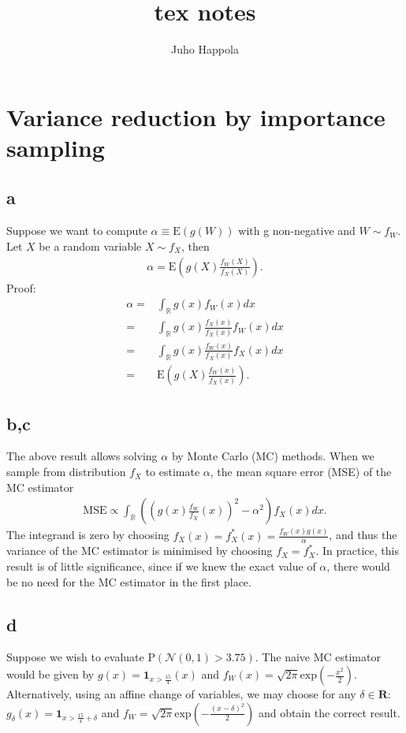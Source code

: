 \documentclass[a4paper,11pt]{article}
\title{tex notes}
\author{Juho Happola}
\newcommand{\expf}[1]{\mathrm{exp}\left ( {#1}\right )}
\newcommand{\parent}[1]{\left( {#1} \right)}
\newcommand{\probb}[1]{\mathrm{P} \parent{{#1}}}
\newcommand{\expp}[1]{\mathrm{E} \parent{{#1}}}
\begin{document}
\section*{Variance reduction by importance sampling}

\subsection*{a}
Suppose we want to compute $\alpha \equiv \expp{g \parent{W}}$
with g non-negative and $W \sim f_W$. Let $X$ be a random variable
$X \sim f_X$, then
\begin{align}
\alpha = \expp{g \parent{X} \frac{f_W \parent{X}}{ f_X \parent{X}}}.
\end{align}
Proof:
\begin{align}
\alpha =& \int_{\mathbb R} g \parent{x} f_W \parent{x} dx
\\
=& 
\int_{\mathbb R} g \parent{x} \frac{ f_X \parent{x} }{ f_X \parent{x} } f_W \parent{x} dx
\\
=& 
\int_{\mathbb R} g \parent{x} \frac{ f_W \parent{x} }{ f_X \parent{x} } f_X \parent{x} dx
\\
=& \expp{g \parent{X} \frac{ f_W \parent{x} }{ f_X \parent{x} } }.
\end{align}

\subsection*{b,c}
The above result allows solving $\alpha$ by Monte Carlo (MC) methods.
When we sample from distribution $f_X$ to estimate $\alpha$,
the mean square error (MSE) of the MC estimator 
\begin{align}
\mathrm{MSE} \propto \int_{\mathbb R}  \parent{ \parent{g\parent{x} \frac{f_W}{f_X} \parent{x}}^2 - \alpha^2 }  f_X \parent{x} dx.
\end{align}
The integrand is zero by choosing $f_X \parent{x}=f_X^* \parent{x} = \frac{f_W \parent{x} g \parent{x}}{\alpha}$, and thus
the variance of the MC estimator is minimised by choosing $f_X=f_X^*$. In practice, this result is of little significance,
since if we knew the exact value of $\alpha$, there would be no need for the MC estimator in the first place.

\subsection*{d}
Suppose we wish to evaluate $\probb{\mathcal N \parent{0,1} >3.75}$.
The naive MC estimator would be given by $g \parent{x} = \mathbf 1_{x>\frac{15}{4}} \parent{x}$ and
$f_W \parent{x} = \sqrt{2 \pi } \expf{-\frac{x^2}{2}}$. Alternatively, using an affine change
of variables,
we may choose for any $\delta \in \mathbf R$: $g_\delta \parent{x} = \mathbf 1_{x>\frac{15}{4}+\delta}$
and $f_W = \sqrt{2 \pi } \expf{-\frac{\parent{x-\delta}^2}{2}}$ and obtain the correct result.
\end{document}

